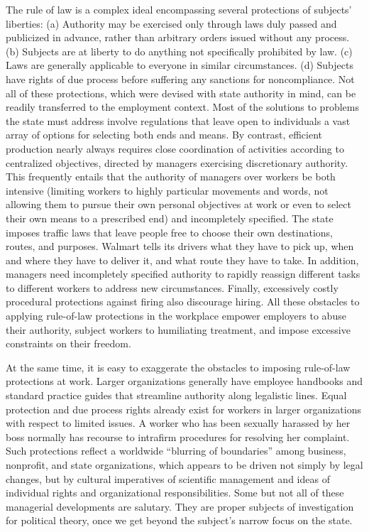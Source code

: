 \documentclass[
  letterpaper,
  11pt,
  DIV=9,
  openright]{scrbook}
\begin{document}
The rule of law is a complex ideal encompassing several protections of
subjects' liberties: (a) Authority may be exercised only through laws
duly passed and publicized in advance, rather than arbitrary orders
issued without any process. (b) Subjects are at liberty to do anything
not specifically prohibited by law. (c) Laws are generally applicable to
everyone in similar circumstances. (d) Subjects have rights of due
process before suffering any sanctions for noncompliance. Not all of
these protections, which were devised with state authority in mind, can
be readily transferred to the employment context. Most of the solutions
to problems the state must address involve regulations that leave open
to individuals a vast array of options for selecting both ends and
means. By contrast, efficient production nearly always requires close
coordination of activities according to centralized objectives, directed
by managers exercising discretionary authority. This frequently entails
that the authority of managers over workers be both intensive (limiting
workers to highly particular movements and words, not allowing them to
pursue their own personal objectives at work or even to select their own
means to a prescribed end) and incompletely specified. The state imposes
traffic laws that leave people free to choose their own destinations,
routes, and purposes. Walmart tells its drivers what they have to pick
up, when and where they have to deliver it, and what route they have to
take. In addition, managers need incompletely specified authority to
rapidly reassign different tasks to different workers to address new
circumstances. Finally, excessively costly procedural protections
against firing also discourage hiring. All these obstacles to applying
rule-of-law protections in the workplace empower employers to abuse
their authority, subject workers to humiliating treatment, and impose
excessive constraints on their freedom.

At the same time, it is easy to exaggerate the obstacles to imposing
rule-of-law protections at work. Larger organizations generally have
employee handbooks and standard practice guides that streamline
authority along legalistic lines. Equal protection and due process
rights already exist for workers in larger organizations with respect to
limited issues. A worker who has been sexually harassed by her boss
normally has recourse to intrafirm procedures for resolving her
complaint. Such protections reflect a worldwide ``blurring of
boundaries'' among business, nonprofit, and state organizations, which
appears to be driven not simply by legal changes, but by cultural
imperatives of scientific management and ideas of individual rights and
organizational responsibilities. Some but not all of these managerial
developments are salutary. They are proper subjects of investigation for
political theory, once we get beyond the subject's narrow focus on the
state.
\end{document}
